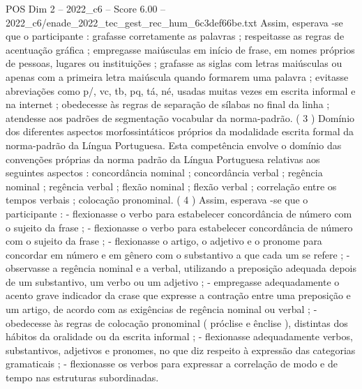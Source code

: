 \begin{textsample}{POS Dim 2 – 2022\_c6 – Score 6.00 – 2022\_c6/enade\_2022\_tec\_gest\_rec\_hum\_6c3def66be.txt}
Assim, esperava -se que o participante : grafasse corretamente as palavras ; respeitasse as regras de acentuação gráfica ; empregasse maiúsculas em início de frase, em nomes próprios de pessoas, lugares ou instituições ; grafasse as siglas com letras maiúsculas ou apenas com a primeira letra maiúscula quando formarem uma palavra ; evitasse abreviações como p/, vc, tb, pq, tá, né, usadas muitas vezes em escrita informal e na internet ; obedecesse às regras de separação de sílabas no final da linha ; atendesse aos padrões de segmentação vocabular da norma-padrão. ( 3 ) Domínio dos diferentes aspectos morfossintáticos próprios da modalidade escrita formal da norma-padrão da Língua Portuguesa.
Esta competência envolve o domínio das convenções próprias da norma padrão da Língua Portuguesa relativas aos seguintes aspectos : concordância nominal ; concordância verbal ; regência nominal ; regência verbal ; flexão nominal ; flexão verbal ; correlação entre os tempos verbais ; colocação pronominal. ( 4 ) Assim, esperava -se que o participante : - flexionasse o verbo para estabelecer concordância de número com o sujeito da frase ; - flexionasse o verbo para estabelecer concordância de número com o sujeito da frase ; - flexionasse o artigo, o adjetivo e o pronome para concordar em número e em gênero com o substantivo a que cada um se refere ; - observasse a regência nominal e a verbal, utilizando a preposição adequada depois de um substantivo, um verbo ou um adjetivo ; - empregasse adequadamente o acento grave indicador da crase que expresse a contração entre uma preposição e um artigo, de acordo com as exigências de regência nominal ou verbal ; - obedecesse às regras de colocação pronominal ( próclise e ênclise ), distintas dos hábitos da oralidade ou da escrita informal ; - flexionasse adequadamente verbos, substantivos, adjetivos e pronomes, no que diz respeito à expressão das categorias gramaticais ; - flexionasse os verbos para expressar a correlação de modo e de tempo nas estruturas subordinadas.

\end{textsample}
